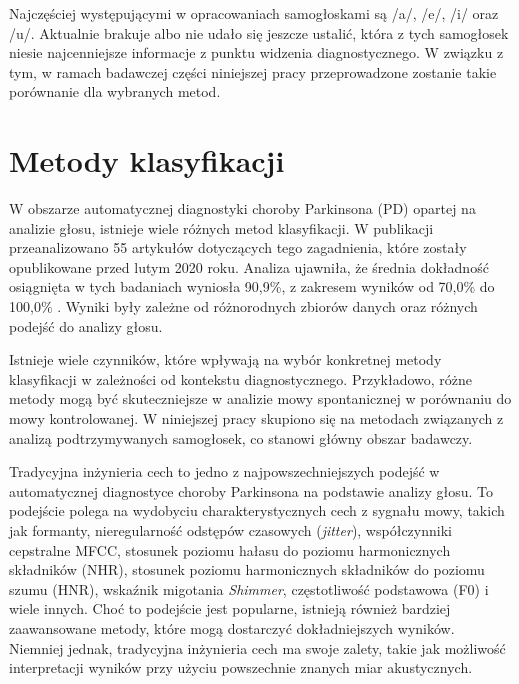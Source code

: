 Najczęściej występującymi w opracowaniach samogłoskami są /a/, /e/, /i/ oraz /u/.
Aktualnie brakuje albo nie udało się jeszcze ustalić, która z tych samogłosek niesie najcenniejsze informacje z punktu widzenia diagnostycznego.
W związku z tym, w ramach badawczej części niniejszej pracy przeprowadzone zostanie takie porównanie dla wybranych metod.

\section{Metody klasyfikacji}\label{sec:metody-klasyfikacji}

W obszarze automatycznej diagnostyki choroby Parkinsona (PD) opartej na analizie głosu, istnieje wiele różnych metod klasyfikacji.
W publikacji \cite{ML_for_PD_review} przeanalizowano 55 artykułów dotyczących tego zagadnienia, które zostały opublikowane przed lutym 2020 roku.
Analiza ujawniła, że średnia dokładność osiągnięta w tych badaniach wyniosła 90,9\%, z zakresem wyników od 70,0\%
\cite{7378178, multimodel-framework} do 100,0\% \cite{new-hybrid, fuzzy-neural-system, linear-discriminant-analysis, dastjerd}.
Wyniki były zależne od różnorodnych zbiorów danych oraz różnych podejść do analizy głosu.

Istnieje wiele czynników, które wpływają na wybór konkretnej metody klasyfikacji w zależności od kontekstu diagnostycznego.
Przykładowo, różne metody mogą być skuteczniejsze w analizie mowy spontanicznej w porównaniu do mowy kontrolowanej.
W niniejszej pracy skupiono się na metodach związanych z analizą podtrzymywanych samogłosek, co
stanowi główny obszar badawczy.

Tradycyjna inżynieria cech to jedno z najpowszechniejszych podejść w automatycznej diagnostyce choroby Parkinsona na podstawie analizy głosu.
To podejście polega na wydobyciu charakterystycznych cech z sygnału mowy, takich jak formanty, nieregularność odstępów czasowych (\emph{jitter}),
współczynniki cepstralne MFCC, stosunek poziomu hałasu do poziomu harmonicznych składników (NHR), stosunek poziomu harmonicznych składników
do poziomu szumu (HNR), wskaźnik migotania \emph{Shimmer}, częstotliwość podstawowa (F0) i wiele innych.
Choć to podejście jest popularne, istnieją również bardziej zaawansowane metody, które mogą dostarczyć dokładniejszych wyników.
Niemniej jednak, tradycyjna inżynieria cech ma swoje zalety, takie jak możliwość interpretacji wyników przy użyciu powszechnie znanych miar akustycznych.

